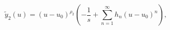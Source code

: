 \begin{equation}
{\tilde y}_2(u) = (u-u_0)^{\rho_2} \left( -\frac{1}{s} + 
\sum\limits_{n=1}^\infty h_n(u-u_0)^n \right),
\end{equation}


